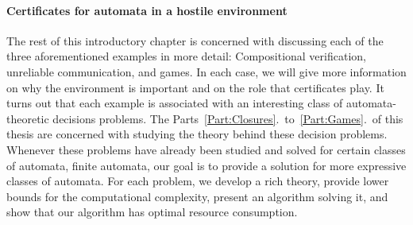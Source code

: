 \documentclass[../../diss.tex]{subfiles}
\begin{document}
\paragraph{Certificates for automata in a hostile environment}

The rest of this introductory chapter is concerned with discussing each of the three aforementioned examples in more detail:
Compositional verification, unreliable communication, and games.
In each case, we will give more information on why the environment is important and on the role that certificates play.
It turns out that each example is associated with an interesting class of automata-theoretic decisions problems.
The Parts~\ref{Part:Closures}.~to~\ref{Part:Games}.~of this thesis are concerned with studying the theory behind these decision problems.
Whenever these problems have already been studied and solved for certain classes of automata, \eg finite automata, our goal is to provide a solution for more expressive classes of automata.
For each problem,
we develop a rich theory,
provide lower bounds for the computational complexity,
present an algorithm solving it,
and show that our algorithm has optimal resource consumption.
\end{document}

